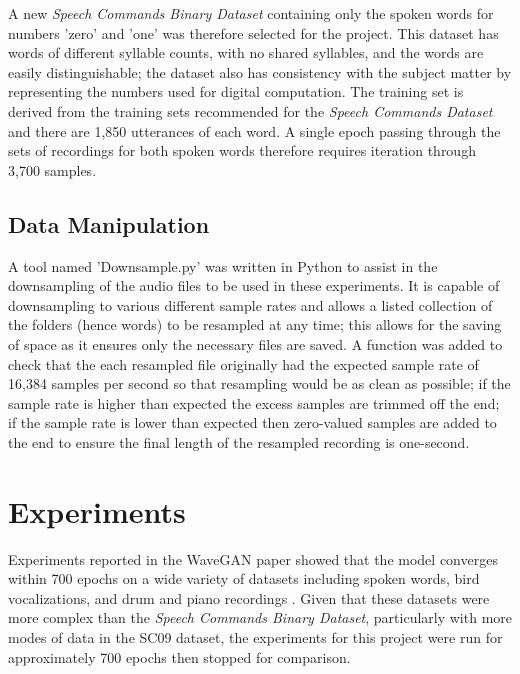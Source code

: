 \documentclass[a4paper, titlepage]{article}
\begin{document}
A new \textit{Speech Commands Binary Dataset} containing only the spoken words for numbers 'zero' and 'one' was therefore selected for the project.
This dataset has words of different syllable counts, with no shared syllables, and the words are easily distinguishable; the dataset also has consistency with the subject matter by representing the numbers used for digital computation.
\newline
\newline
The training set is derived from the training sets recommended for the \textit{Speech Commands Dataset} and there are 1,850 utterances of each word.
A single epoch passing through the sets of recordings for both spoken words therefore requires iteration through 3,700 samples.

\subsection{Data Manipulation}

A tool named 'Downsample.py' was written in Python to assist in the downsampling of the audio files to be used in these experiments.
It is capable of downsampling to various different sample rates and allows a listed collection of the folders (hence words) to be resampled at any time; this allows for the saving of space as it ensures only the necessary files are saved.
\newline
\newline
A function was added to check that the each resampled file originally had the expected sample rate of 16,384 samples per second so that resampling would be as clean as possible; if the sample rate is higher than expected the excess samples are trimmed off the end; if the sample rate is lower than expected then zero-valued samples are added to the end to ensure the final length of the resampled recording is one-second.

\newpage

\section{Experiments}

Experiments reported in the WaveGAN paper showed that the model converges within 700 epochs on a wide variety of datasets including spoken words, bird vocalizations, and drum and piano recordings \citep{2018arXiv180204208D}.
Given that these datasets were more complex than the \textit{Speech Commands Binary Dataset}, particularly with more modes of data in the \ac{SC09} dataset, the experiments for this project were run for approximately 700 epochs then stopped for comparison.
\end{document}
